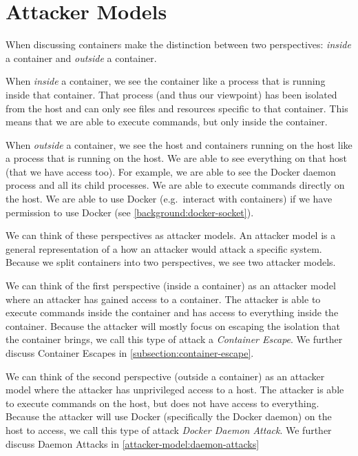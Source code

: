 \chapter{Attacker Models}\label{chapter:attack-surface-models}
When discussing containers make the distinction between two perspectives: \emph{inside} a container and \emph{outside} a container.

When \emph{inside} a container, we see the container like a process that is running inside that container. That process (and thus our viewpoint) has been isolated from the host and can only see files and resources specific to that container. This means that we are able to execute commands, but only inside the container.

When \emph{outside} a container, we see the host and containers running on the host like a process that is running on the host. We are able to see everything on that host (that we have access too). For example, we are able to see the Docker daemon process and all its child processes. We are able to execute commands directly on the host. We are able to use Docker (e.g.\ interact with containers) if we have permission to use Docker (see \autoref{background:docker-socket}).

\medskip

We can think of these perspectives as attacker models. An attacker model is a general representation of a how an attacker would attack a specific system. Because we split containers into two perspectives, we see two attacker models.

We can think of the first perspective (inside a container) as an attacker model where an attacker has gained access to a container. The attacker is able to execute commands inside the container and has access to everything inside the container. Because the attacker will mostly focus on escaping the isolation that the container brings, we call this type of attack a \emph{Container Escape}. We further discuss Container Escapes in \autoref{subsection:container-escape}.

We can think of the second perspective (outside a container) as an attacker model where the attacker has unprivileged access to a host. The attacker is able to execute commands on the host, but does not have access to everything. Because the attacker will use Docker (specifically the Docker daemon) on the host to access, we call this type of attack \emph{Docker Daemon Attack}. We further discuss Daemon Attacks in \autoref{attacker-model:daemon-attacks}

